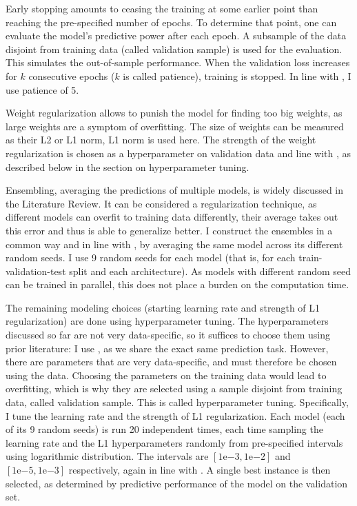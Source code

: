 		Early stopping amounts to ceasing the training at some earlier point than reaching the pre-specified number of epochs. To determine that point, one can evaluate the model's predictive power after each epoch. A subsample of the data disjoint from training data (called validation sample) is used for the evaluation. This simulates the out-of-sample performance. When the validation loss increases for $k$ consecutive epochs ($k$ is called patience), training is stopped. In line with \cite{gu2020empirical}, I use patience of 5. 
		
		Weight regularization allows to punish the model for finding too big weights, as large weights are a symptom of overfitting. The size of weights can be measured as their L2 or L1 norm, L1 norm is used here. The strength of the weight regularization is chosen as a hyperparameter on validation data and line with \cite{gu2020empirical}, as described below in the section on hyperparameter tuning.
		
		Ensembling, averaging the predictions of multiple models, is widely discussed in the Literature Review. It can be considered a regularization technique, as different models can overfit to training data differently, their average takes out this error and thus is able to generalize better. I construct the ensembles in a common way and in line with \cite{gu2020empirical}, by averaging the same model across its different random seeds. I use 9 random seeds for each model (that is, for each train-validation-test split and each architecture). As models with different random seed can be trained in parallel, this does not place a burden on the computation time.
			
		The remaining modeling choices (starting learning rate and strength of L1 regularization) are done using hyperparameter tuning. The hyperparameters discussed so far are not very data-specific, so it suffices to choose them using prior literature: I use \cite{gu2020empirical}, as we share the exact same prediction task. However, there are parameters that are very data-specific, and must therefore be chosen using the data. Choosing the parameters on the training data would lead to overfitting, which is why they are selected using a sample disjoint from training data, called validation sample. This is called hyperparameter tuning. Specifically, I tune the learning rate and the strength of L1 regularization. Each model (each of its 9 random seeds) is run 20 independent times, each time sampling the learning rate and the L1 hyperparameters randomly from pre-specified intervals using logarithmic distribution. The intervals are $\left[1\mathrm{e}{-3}, 1\mathrm{e}{-2}\right]$ and $\left[1\mathrm{e}{-5}, 1\mathrm{e}{-3}\right]$ respectively, again in line with \cite{gu2020empirical}. A single best instance is then selected, as determined by predictive performance of the model on the validation set.
		
